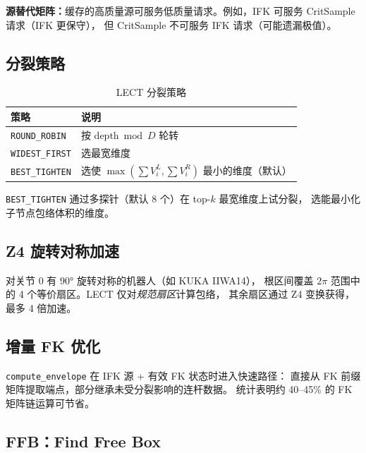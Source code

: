\documentclass[11pt,a4paper]{article}
\begin{document}
\textbf{源替代矩阵：}缓存的高质量源可服务低质量请求。例如，IFK 可服务 CritSample 请求（IFK 更保守），
但 CritSample 不可服务 IFK 请求（可能遗漏极值）。

\subsection{分裂策略}

\begin{table}[ht]
\centering
\caption{LECT 分裂策略}
\label{tab:split}
\begin{tabular}{@{}ll@{}}
\toprule
\textbf{策略} & \textbf{说明} \\
\midrule
\texttt{ROUND\_ROBIN} & 按 $\mathrm{depth} \bmod D$ 轮转 \\
\texttt{WIDEST\_FIRST} & 选最宽维度 \\
\texttt{BEST\_TIGHTEN} & 选使 $\max(\sum V_i^L, \sum V_i^R)$ 最小的维度（默认） \\
\bottomrule
\end{tabular}
\end{table}

\texttt{BEST\_TIGHTEN} 通过多探针（默认 8 个）在 top-$k$ 最宽维度上试分裂，
选能最小化子节点包络体积的维度。

\subsection{Z4 旋转对称加速}

对关节 0 有 $90°$ 旋转对称的机器人（如 KUKA IIWA14），
根区间覆盖 $2\pi$ 范围中的 4 个等价扇区。LECT 仅对\emph{规范扇区}计算包络，
其余扇区通过 Z4 变换获得，最多 4 倍加速。

\subsection{增量 FK 优化}

\texttt{compute\_envelope} 在 IFK 源 + 有效 FK 状态时进入快速路径：
直接从 FK 前缀矩阵提取端点，部分继承未受分裂影响的连杆数据。
统计表明约 40--45\% 的 FK 矩阵链运算可节省。

\subsection{FFB：Find Free Box}
\end{document}
